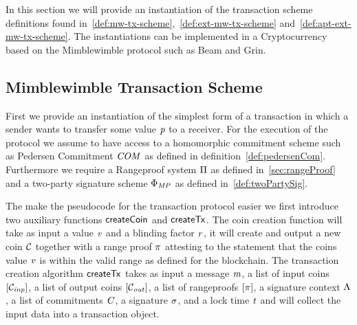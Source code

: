 In this section we will provide an instantiation of the transaction scheme definitions found in~\ref{def:mw-tx-scheme},~\ref{def:ext-mw-tx-scheme} and~\ref{def:apt-ext-mw-tx-scheme}. The instantiations can be implemented in a Cryptocurrency based on the Mimblewimble protocol such as Beam and Grin.

\subsection{Mimblewimble Transaction Scheme}

First we provide an instantiation of the simplest form of a transaction in which a sender wants to transfer some value $\mathit{p}$ to a receiver.
For the execution of the protocol we assume to have access to a homomorphic commitment scheme such as Pedersen Commitment $\mathit{COM}$ as defined in definition~\ref{def:pedersenCom}.
Furthermore we require a Rangeproof system $\Pi$ as defined in~\ref{sec:rangeProof} and a two-party signature scheme $\Phi_{\mathit{MP}}$ as defined in~\ref{def:twoPartySig}.

The make the pseudocode for the transaction protocol easier we first introduce two auxiliary functions $\mathsf{createCoin}$
and $\mathsf{createTx}$. The coin creation function will take as input a value $\mathit{v}$ and a blinding factor $\mathit{r}$, it will create and output a new coin $\mathcal{C}$ together with a range proof
$\pi$ attesting to the statement that the coins value $\mathit{v}$ is within the valid range as defined for the blockchain.
The transaction creation algorithm $\mathsf{createTx}$ takes as input a message $\mathit{m}$, a list of input coins $[\mathcal{C}_{\mathit{inp}}]$, a list of output coins $[\mathcal{C}_{\mathit{out}}]$, a list of rangeproofs
$[\pi]$, a signature context $\Lambda$, a list of commitments $\mathit{C}$, a signature $\sigma$, and a lock time $\mathit{t}$ and will collect the input data into a transaction object.


